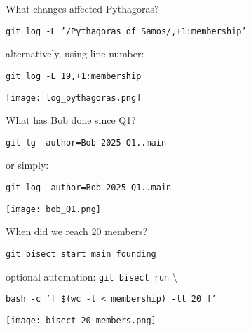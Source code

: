 \documentclass{beamer}
\begin{document}
\begin{frame}
    \centering
    \Large What changes affected Pythagoras?

    \pause
    \vspace{\baselineskip}
    \small{\texttt{git log -L '/Pythagoras of Samos/,+1:membership'}

    \vspace{\baselineskip}
    alternatively, using line number:

    \texttt{git log -L 19,+1:membership}}

    \vspace{\baselineskip}
    \texttt{[image: log\_pythagoras.png]}
\end{frame}

\begin{frame}
    \centering
    \Large What has Bob done since Q1?

    \pause
    \vspace{\baselineskip}
    \small{\texttt{git lg --author=Bob 2025-Q1..main}

    \vspace{\baselineskip}
    or simply:

    \texttt{git log --author=Bob 2025-Q1..main}}

    \vspace{\baselineskip}
    \texttt{[image: bob\_Q1.png]}
\end{frame}

\begin{frame}
    \centering
    \Large When did we reach 20 members?

    \pause
    \vspace{\baselineskip}
    \small{\texttt{git bisect start main founding}

    \vspace{\baselineskip}
    optional automation: \texttt{git bisect run} \textbackslash

    \texttt{bash -c '[ \$(wc -l < membership) -lt 20 ]'}}

    \vspace{\baselineskip}
    \texttt{[image: bisect\_20\_members.png]}
\end{frame}
\end{document}

